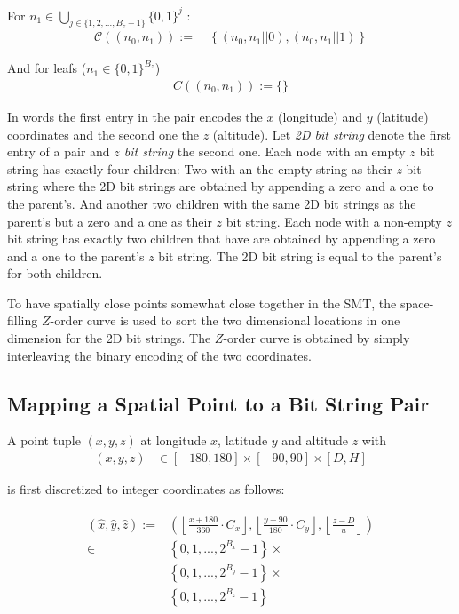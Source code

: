 \documentclass[10pt,conference,compsocconf]{IEEEtran}
\begin{document}
For $n_1 \in \bigcup_{j \in \{1,2,...,B_z-1\}} \{0,1\}^{j}$ :
\begin{align*}
	\mathcal{C}\left(\left(n_0, n_1\right)\right) :=\:& \left\{(n_0, n_1 || 0), (n_0, n_1 || 1) \right\}
\end{align*}

And for leafs ($n_1 \in \{0,1\}^{B_z}$)
\begin{align*}
	C\left(\left(n_0, n_1\right)\right) := \{ \}
\end{align*}

In words the first entry in the pair encodes the $x$ (longitude) and $y$ (latitude) coordinates and the second one the $z$ (altitude).
Let \emph{2D bit string} denote the first entry of a pair and \emph{$z$ bit string} the second one.
Each node with an empty $z$ bit string has exactly four children:
Two with an the empty string as their $z$ bit string where the 2D bit strings are obtained by appending a zero and a one to the parent's.
And another two children with the same 2D bit strings as the parent's but a zero and a one as their $z$ bit string.
Each node with a non-empty $z$ bit string has exactly two children that have are obtained by appending a zero and a one to the parent's $z$ bit string. The 2D bit string is equal to the parent's for both children.

To have spatially close points somewhat close together in the SMT, the space-filling $Z$-order curve is used to sort the two dimensional locations in one dimension \cite{morton_computer_1966} for the 2D bit strings.
The $Z$-order curve is obtained by simply interleaving the binary encoding of the two coordinates.

\subsection{Mapping a Spatial Point to a Bit String Pair}
\label{sec:data-structure:mapping-spatial-point}
A point tuple $(x,y,z)$ at longitude $x$, latitude $y$ and altitude $z$ with
\begin{align*}
	(x, y, z) &\in [-180, 180] \times [-90, 90] \times [D, H]
\end{align*}

is first discretized to integer coordinates as follows:

\begin{align}
\begin{split}
\label{eq:discretization}
(\hat{x},\hat{y}, \hat{z}) := &
\left(
%
\left\lfloor
\frac{x + 180}{360} \cdot C_x
\right\rfloor,
%
\left\lfloor
\frac{y + 90}{180} \cdot C_y
\right\rfloor,
%
\left\lfloor
\frac{z - D}{u}
\right\rfloor
%
\right)
\\
\in &\left\{0, 1, ..., 2^{B_x} - 1\right\} \times\\
& \left\{0, 1, ..., 2^{B_y} - 1\right\} \times \\
& \left\{0, 1, ..., 2^{B_z} - 1\right\}
\end{split}
\end{align}
\end{document}
